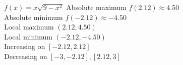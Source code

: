 {$f(x) = x\sqrt{9 - x^{2}}$}
{ Absolute maximum $f(2.12) \approx 4.50$ \\
Absolute minimum $f(-2.12) \approx -4.50$ \\
Local maximum $(2.12, 4.50)$ \\
Local minimum $(-2.12, -4.50)$\\
Increasing on $[-2.12, 2.12]$\\
Decreasing on $[-3, -2.12], [2.12, 3]$
}